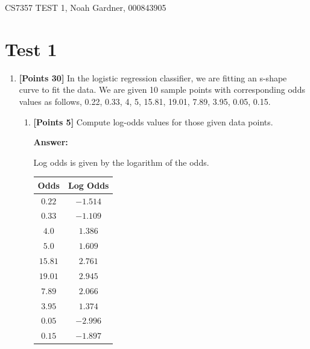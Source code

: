 \documentclass[12pt]{article}
\begin{document}
CS7357 TEST 1, Noah Gardner, 000843905\newline

\section{Test 1}
\begin{enumerate}
    \item \textbf{[Points 30]} In the logistic regression classifier, we are
          fitting an s-shape curve to fit the data. We are given 10 sample points
          with corresponding odds values as follows, 0.22, 0.33, 4, 5, 15.81,
          19.01, 7.89, 3.95, 0.05, 0.15.

          \begin{enumerate}
              \item \textbf{[Points 5]} Compute log-odds values for those given
                    data points.

                    \textbf{Answer:}

                    Log odds is given by the logarithm of the odds.

                    \begin{table}[h]
                        \centering
                        \begin{tabular}{c|c}
                            \textbf{Odds} & \textbf{Log Odds} \\
                            \hline
                            $0.22$        & $-1.514$          \\
                            $0.33$        & $-1.109$          \\
                            $4.0$         & $1.386$           \\
                            $5.0$         & $1.609$           \\
                            $15.81$       & $2.761$           \\
                            $19.01$       & $2.945$           \\
                            $7.89$        & $2.066$           \\
                            $3.95$        & $1.374$           \\
                            $0.05$        & $-2.996$          \\
                            $0.15$        & $-1.897$          \\
                        \end{tabular}
                    \end{table}


\end{enumerate}
\end{enumerate}
\end{document}
